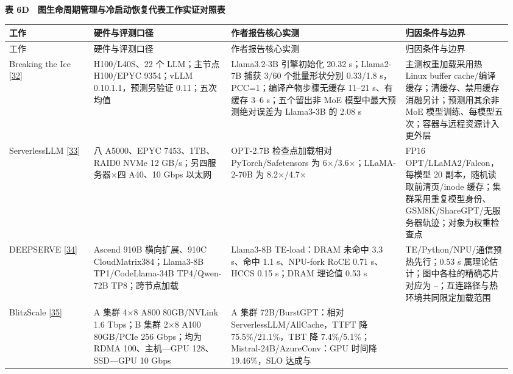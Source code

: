 \documentclass[UTF8,10.5pt,fontset=windows]{ctexart}
\newcommand{\TableTitle}[1]{\par\Needspace{5\baselineskip}\begingroup\centering\bfseries\fontsize{9.5}{13}\selectfont #1\par\endgroup\nobreak}
\begin{document}
\begin{landscape}
\begingroup
\fontsize{8.6}{11.8}\selectfont
\setlength{\tabcolsep}{2.5pt}
\setlength{\emergencystretch}{0.5\linewidth}
\renewcommand{\arraystretch}{1.10}
\TableTitle{\textbf{表 6D　图生命周期管理与冷启动恢复代表工作实证对照表}}
\begin{longtable}[c]{@{}>{\raggedright\arraybackslash}p{0.1632\linewidth}
>{\raggedright\arraybackslash}p{0.2688\linewidth}
>{\raggedright\arraybackslash}p{0.3360\linewidth}
>{\raggedright\arraybackslash}p{0.1920\linewidth}@{}}
\toprule
工作 & 硬件与评测口径 & 作者报告核心实测 & 归因条件与边界 \\
\midrule\endfirsthead
\toprule
工作 & 硬件与评测口径 & 作者报告核心实测 & 归因条件与边界 \\
\midrule\endhead
\bottomrule\endfoot
\bottomrule\endlastfoot
Breaking the Ice
{[}\protect\hyperlink{ref-kabakibo2026breakingice}{32}{]} &
H100/L40S、22 个 LLM；主节点 H100/EPYC 9354；vLLM 0.10.1.1，预测另验证
0.11；五次均值 & Llama3.2-3B 引擎初始化 20.32 s；Llama2-7B 捕获 3/60
个批量形状分别 0.33/1.8 s，PCC=1；编译产物步骤无缓存 11--21 s、有缓存
3--6 s；五个留出非 MoE 模型中最大预测绝对误差为 Llama3-3B 的 2.08 s &
主测权重加载采用热 Linux buffer
cache/编译缓存；清缓存、禁用缓存消融另计；预测用其余非 MoE
模型训练、每模型五次；容器与远程资源计入更外层 \\
ServerlessLLM {[}\protect\hyperlink{ref-fu2024serverlessllm}{33}{]} & 八
A5000、EPYC 7453、1TB、RAID0 NVMe 12 GB/s；另四服务器\(\times\)四 A40、10 Gbps
以太网 & OPT-2.7B 检查点加载相对 PyTorch/Safetensors 为
6\(\times\)/3.6\(\times\)；LLaMA-2-70B 为 8.2\(\times\)/4.7\(\times\) & FP16 OPT/LLaMA2/Falcon，每模型 20
副本，随机读取前清页/inode
缓存；集群采用重复模型身份、GSM8K/ShareGPT/无服务器轨迹；对象为权重检查点 \\
DEEPSERVE {[}\protect\hyperlink{ref-hu2025deepserve}{34}{]} & Ascend
910B 横向扩展、910C CloudMatrix384；Llama3-8B TP1/CodeLlama-34B
TP4/Qwen-72B TP8；跨节点加载 & Llama3-8B TE-load：DRAM 未命中 3.3
s、命中 1.1 s、NPU-fork RoCE 0.71 s、HCCS 0.15 s；DRAM 理论值 0.53 s &
TE/Python/NPU/通信预热先行；0.53 s 属理论估计；图中各柱的精确芯片对应为
--；互连路径与热环境共同限定加载范围 \\
BlitzScale {[}\protect\hyperlink{ref-zhang2025blitzscale}{35}{]} & A
集群 4\(\times\)8 A800 80GB/NVLink 1.6 Tbps；B 集群 2\(\times\)8 A100 80GB/PCIe 256
Gbps；均为 RDMA 100、主机---GPU 128、SSD---GPU 10 Gbps & A 集群
72B/BurstGPT：相对 ServerlessLLM/AllCache，TTFT 降 75.5\%/21.1\%，TBT 降
7.4\%/5.1\%；Mistral-24B/AzureConv：GPU 时间降 19.46\%，SLO 达成与

\end{longtable}
\end{landscape}
\end{document}
